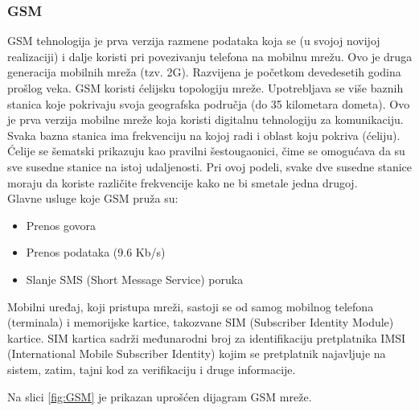 \documentclass[a4paper]{article}
\begin{document}
        \subsubsection{GSM}
GSM tehnologija je prva verzija razmene podataka koja se (u svojoj novijoj realizaciji) i dalje koristi pri povezivanju telefona na mobilnu mrežu. Ovo je druga generacija mobilnih mreža (tzv. 2G). Razvijena je početkom devedesetih godina prošlog veka.
GSM koristi ćelijsku topologiju mreže. Upotrebljava se više baznih stanica koje pokrivaju svoja geografska područja (do 35 kilometara dometa). Ovo je prva verzija mobilne mreže koja koristi digitalnu tehnologiju za komunikaciju.
Svaka bazna stanica ima frekvenciju na kojoj radi i oblast koju pokriva (ćeliju). Ćelije se šematski prikazuju kao pravilni šestougaonici, čime se omogućava da su sve susedne stanice na istoj udaljenosti. Pri ovoj podeli, svake dve susedne stanice moraju da koriste različite frekvencije kako ne bi smetale jedna drugoj. \\
Glavne usluge koje GSM pruža su:
\begin{itemize}
    \item Prenos govora
    \item Prenos podataka (9.6 Kb/s)
    \item Slanje SMS (Short Message Service) poruka
\end{itemize}
Mobilni uređaj, koji pristupa mreži,  sastoji se od samog mobilnog telefona (terminala) i memorijske kartice, takozvane SIM (Subscriber Identity Module) kartice. SIM kartica sadrži međunarodni broj za identifikaciju pretplatnika IMSI (International Mobile Subscriber Identity) kojim se pretplatnik najavljuje na sistem, zatim, tajni kod za verifikaciju i druge informacije.

Na slici \ref{fig:GSM} je prikazan uprošćen dijagram GSM mreže.
\end{document}
